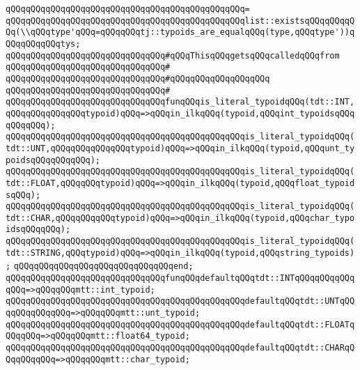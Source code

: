 \verb|qQQqqQQqqQQqqQQqqQQqqQQqqQQqqQQqqQQqqQQqqQQqqQQq=|\newline
\verb|qQQqqQQqqQQqqQQqqQQqqQQqqQQqqQQqqQQqqQQqqQQqqQQqlist::existsqQQqqQQqqQQq(\\qQQqtype'qQQq=qQQqqQQqtj::typoids_are_equalqQQq(type,qQQqtype'))qQQqqQQqqQQqtys;|\newline
\newline
\verb|qQQqqQQqqQQqqQQqqQQqqQQqqQQqqQQq#qQQqThisqQQqgetsqQQqcalledqQQqfrom|\newline
\verb|qQQqqQQqqQQqqQQqqQQqqQQqqQQqqQQq#|\newline
\verb|qQQqqQQqqQQqqQQqqQQqqQQqqQQqqQQq#qQQqqQQqqQQqqQQqqQQq|\newline
\verb|qQQqqQQqqQQqqQQqqQQqqQQqqQQqqQQq#|\newline
\verb|qQQqqQQqqQQqqQQqqQQqqQQqqQQqqQQqfunqQQqis_literal_typoidqQQq(tdt::INT,qQQqqQQqqQQqqQQqtypoid)qQQq=>qQQqin_ilkqQQq(typoid,qQQqint_typoidsqQQqqQQqqQQq);|\newline
\verb|qQQqqQQqqQQqqQQqqQQqqQQqqQQqqQQqqQQqqQQqqQQqqQQqis_literal_typoidqQQq(tdt::UNT,qQQqqQQqqQQqqQQqtypoid)qQQq=>qQQqin_ilkqQQq(typoid,qQQqunt_typoidsqQQqqQQqqQQq);|\newline
\verb|qQQqqQQqqQQqqQQqqQQqqQQqqQQqqQQqqQQqqQQqqQQqqQQqis_literal_typoidqQQq(tdt::FLOAT,qQQqqQQqtypoid)qQQq=>qQQqin_ilkqQQq(typoid,qQQqfloat_typoidsqQQq);|\newline
\verb|qQQqqQQqqQQqqQQqqQQqqQQqqQQqqQQqqQQqqQQqqQQqqQQqis_literal_typoidqQQq(tdt::CHAR,qQQqqQQqqQQqtypoid)qQQq=>qQQqin_ilkqQQq(typoid,qQQqchar_typoidsqQQqqQQq);|\newline
\verb|qQQqqQQqqQQqqQQqqQQqqQQqqQQqqQQqqQQqqQQqqQQqqQQqis_literal_typoidqQQq(tdt::STRING,qQQqtypoid)qQQq=>qQQqin_ilkqQQq(typoid,qQQqstring_typoids);|\newline
\verb|qQQqqQQqqQQqqQQqqQQqqQQqqQQqqQQqend;|\newline
\newline
\verb|qQQqqQQqqQQqqQQqqQQqqQQqqQQqqQQqfunqQQqdefaultqQQqtdt::INTqQQqqQQqqQQqqQQq=>qQQqqQQqmtt::int_typoid;|\newline
\verb|qQQqqQQqqQQqqQQqqQQqqQQqqQQqqQQqqQQqqQQqqQQqqQQqdefaultqQQqtdt::UNTqQQqqQQqqQQqqQQq=>qQQqqQQqmtt::unt_typoid;|\newline
\verb|qQQqqQQqqQQqqQQqqQQqqQQqqQQqqQQqqQQqqQQqqQQqqQQqdefaultqQQqtdt::FLOATqQQqqQQq=>qQQqqQQqmtt::float64_typoid;|\newline
\verb|qQQqqQQqqQQqqQQqqQQqqQQqqQQqqQQqqQQqqQQqqQQqqQQqdefaultqQQqtdt::CHARqQQqqQQqqQQq=>qQQqqQQqmtt::char_typoid;|\newline
